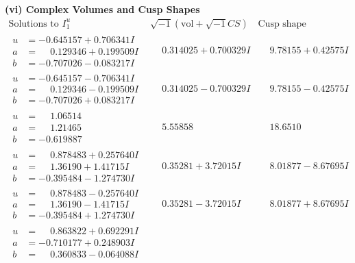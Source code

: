 \documentclass[1p]{elsarticle_modified}
\theoremstyle{definition}
\newcommand{\I}{\sqrt{-1}}
\begin{document}
\newpage\flushleft \textbf{(vi) Complex Volumes and Cusp Shapes}
$$\begin{array}{c|c|c}  
\text{Solutions to }I^u_{1}& \I (\text{vol} + \sqrt{-1}CS) & \text{Cusp shape}\\
 \hline 
\begin{aligned}
u &= -0.645157 + 0.706341 I \\
a &= \phantom{-}0.129346 + 0.199509 I \\
b &= -0.707026 - 0.083217 I\end{aligned}
 & \phantom{-}0.314025 + 0.700329 I & \phantom{-}9.78155 + 0.42575 I \\ \hline\begin{aligned}
u &= -0.645157 - 0.706341 I \\
a &= \phantom{-}0.129346 - 0.199509 I \\
b &= -0.707026 + 0.083217 I\end{aligned}
 & \phantom{-}0.314025 - 0.700329 I & \phantom{-}9.78155 - 0.42575 I \\ \hline\begin{aligned}
u &= \phantom{-}1.06514\phantom{ +0.000000I} \\
a &= \phantom{-}1.21465\phantom{ +0.000000I} \\
b &= -0.619887\phantom{ +0.000000I}\end{aligned}
 & \phantom{-}5.55858\phantom{ +0.000000I} & \phantom{-}18.6510\phantom{ +0.000000I} \\ \hline\begin{aligned}
u &= \phantom{-}0.878483 + 0.257640 I \\
a &= \phantom{-}1.36190 + 1.41715 I \\
b &= -0.395484 - 1.274730 I\end{aligned}
 & \phantom{-}0.35281 + 3.72015 I & \phantom{-}8.01877 - 8.67695 I \\ \hline\begin{aligned}
u &= \phantom{-}0.878483 - 0.257640 I \\
a &= \phantom{-}1.36190 - 1.41715 I \\
b &= -0.395484 + 1.274730 I\end{aligned}
 & \phantom{-}0.35281 - 3.72015 I & \phantom{-}8.01877 + 8.67695 I \\ \hline\begin{aligned}
u &= \phantom{-}0.863822 + 0.692291 I \\
a &= -0.710177 + 0.248903 I \\
b &= \phantom{-}0.360833 - 0.064088 I\end{aligned}

\end{array}$$
\end{document}
